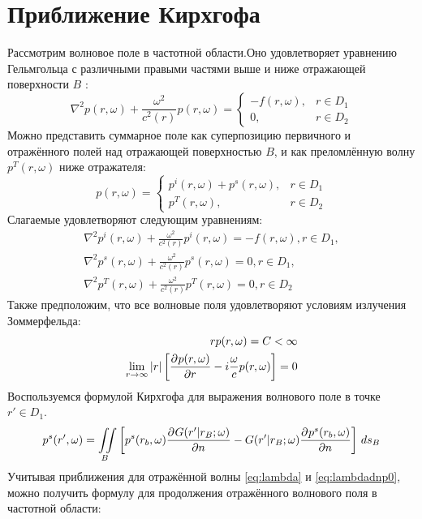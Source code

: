 \documentclass[a4paper, fontsize=14pt]{article}
\begin{document}
	\section{Приближение Кирхгофа}
	Рассмотрим волновое поле в частотной области.Оно удовлетворяет уравнению Гельмгольца с различными правыми частями выше и ниже отражающей поверхности $B$ \cite{zhdanov2007}:
	\begin{equation}
		\nabla^2 p(r,\omega) + \frac{\omega^2}{c^2(r)}p(r,\omega) = \begin{cases}
			-f(r,\omega), & r \in D_1 \\
			0,            & r \in D_2
		\end{cases}
		\label{eq:helmp}
	\end{equation} 
	Можно представить суммарное поле как суперпозицию первичного и отражённого полей над отражающей поверхностью $B$, и как преломлённую волну $p^T(r,\omega)$ ниже отражателя:
	\begin{equation}
		p(r,\omega) = \begin{cases}
			p^i(r,\omega)+p^s(r,\omega),& r \in D_1 \\
			p^T(r,\omega), & r \in D_2
		\end{cases}
	\end{equation}
	Слагаемые удовлетворяют следующим уравнениям:
	\begin{eqnarray}
		\nabla^2 p^i(r,\omega) + \frac{\omega^2}{c^2(r)}p^i(r,\omega) =-f(r,\omega), r \in D_1,\\
		\nabla^2 p^s(r,\omega) + \frac{\omega^2}{c^2(r)}p^s(r,\omega) = 0, r \in D_1,\\
		\nabla^2 p^T(r,\omega) + \frac{\omega^2}{c^2(r)}p^T(r,\omega) =0, r \in D_2
	\end{eqnarray}
	Также предположим, что все волновые поля удовлетворяют условиям излучения Зоммерфельда:
	\begin{eqnarray}
		rp(r,\omega) = C < \infty\\
		\lim\limits_{r\to\infty} |r|\left[\frac{\partial ^ {  } p(r,\omega)}{\partial r ^ {  } } - i\frac{\omega}{c}p(r,\omega)\right] =0
	\end{eqnarray}
	Воспользуемся формулой Кирхгофа для выражения волнового поле в точке $r'\in D_1$.
	\begin{equation}
		p^s(r',\omega)= \iint\limits_B \left[ p^s(r_b,\omega)\frac{\partial ^ {  }  G(r'|r_B;\omega)}{\partial n ^ {  } }- G(r'|r_B;\omega)\frac{\partial ^ {  } p^s(r_b,\omega)}{\partial n ^ {  } }\right] \,ds_B
	\end{equation}
	Учитывая приближения для отражённой волны \ref{eq:lambda} и \ref{eq:lambdadnp0}, можно получить формулу для продолжения отражённого волнового поля в частотной области:
\end{document}
